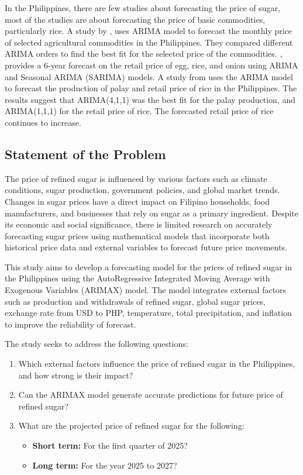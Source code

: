 \documentclass[11pt]{article}
\begin{document}
\indent In the Philippines, there are few studies about forecasting the price of sugar, most of the studies are about forecasting the price of basic commodities, particularly rice. A study by \citet{SelectedCommodities}, uses ARIMA model to forecast the monthly price of selected agricultural commodities in the Philippines. They compared different ARIMA orders to find the best fit for the selected price of the commodities. \citet{Onion} , provides a 6-year forecast on the retail price of egg, rice, and onion using ARIMA and Seasonal ARIMA (SARIMA) models. A study from \citet{Palay} uses the ARIMA model to forecast the production of palay and retail price of rice in the Philippines. The results suggest that ARIMA(4,1,1) was the best fit for the palay production, and ARIMA(1,1,1) for the retail price of rice. The forecasted retail price of rice continues to increase. 


\subsection{Statement of the Problem}
The price of refined sugar is influenced by various factors such as climate conditions, sugar production, government policies, and global market trends. Changes in sugar prices have a direct impact on Filipino households, food manufacturers, and businesses that rely on sugar as a primary ingredient. Despite its economic and social significance, there is limited research on accurately forecasting sugar prices using mathematical models that incorporate both historical price data and external variables to forecast future price movements.

This study aims to develop a forecasting model for the prices of refined sugar in the Philippines using the AutoRegressive Integrated Moving Average with Exogenous Variables (ARIMAX) model. The model integrates external factors such as production and withdrawals of refined sugar, global sugar prices, exchange rate from USD to PHP, temperature, total precipitation, and inflation to improve the reliability of forecast.  

The study seeks to address the following questions:

\begin{enumerate}
    \item Which external factors influence the price of refined sugar in the Philippines, and how strong is their impact?
    \item Can the ARIMAX model generate accurate predictions for future price of refined sugar?
    \item What are the projected price of refined sugar for the following:
    \begin{itemize}
        \item \textbf{Short term:} For the first quarter of 2025?
        \item \textbf{Long term:} For the year 2025 to 2027?
    \end{itemize}
\end{enumerate}
\end{document}

